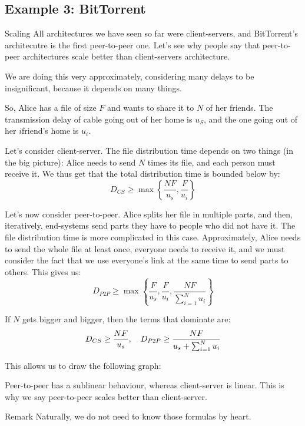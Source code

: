 \documentclass[a4paper]{article}
\begin{document}
\subsection{Example 3: BitTorrent}
\begin{parag}{Scaling}
    All architectures we have seen so far were client-servers, and BitTorrent's architecutre is the first peer-to-peer one. Let's see why people say that peer-to-peer architectures scale better than client-servers architecture.

    We are doing this very approximately, considering many delays to be insignificant, because it depends on many things.

    So, Alice has a file of size $F$ and wants to share it to $N$ of her friends. The transmission delay of cable going out of her home is $u_S$, and the one going out of her $i$\Th friend's home is $u_i$. 

    Let's consider client-server. The file distribution time depends on two things (in the big picture): Alice needs to send $N$ times its file, and each person must receive it. We thus get that the total distribution time is bounded below by: 
    \[D_{CS} \geq \max\left\{\frac{N F}{u_s}, \frac{F}{u_i}\right\}\]

    Let's now consider peer-to-peer. Alice splits her file in multiple parts, and then, iteratively, end-systems send parts they have to people who did not have it. The file distribution time is more complicated in this case. Approximately, Alice needs to send the whole file at least once, everyone needs to receive it, and we must consider the fact that we use everyone's link at the same time to send parts to others. This gives us: 
    \[D_{P2P} \geq \max\left\{\frac{F}{u_s}, \frac{F}{u_i}, \frac{NF}{\sum_{i=1}^{N} u_i}\right\}\]
    
    If $N$ gets bigger and bigger, then the terms that dominate are:
    \[D_{CS} \geq \frac{N F}{u_s}, \quad D_{P2P} \geq \frac{NF}{u_s + \sum_{i=1}^{N} u_i}\]

    This allows us to draw the following graph:

    Peer-to-peer has a sublinear behaviour, whereas client-server is linear. This is why we say peer-to-peer scales better than client-server.

    \begin{subparag}{Remark}
        Naturally, we do not need to know those formulas by heart.
    \end{subparag}
\end{parag}
\end{document}
